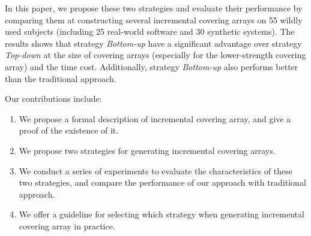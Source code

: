 \documentclass[conference]{IEEEtran}
\theoremstyle{definition}
\begin{document}
In this paper, we propose these two strategies and evaluate their performance by comparing them at constructing several incremental covering arrays on 55 wildly used subjects (including 25 real-world software and 30 synthetic systems). The results shows that strategy \emph{Bottom-up} have a significant advantage over strategy \emph{Top-down} at the size of covering arrays (especially for the lower-strength covering array) and the time cost.  Additionally, strategy \emph{Bottom-up} also performs better than the traditional approach.


%


%
%
%
%
Our contributions include:

 \begin{enumerate}
 \item  We propose a formal description of incremental covering array, and give a proof of the existence of it.
 \item  We propose two strategies for generating incremental covering arrays.
 \item  We conduct a series of experiments to evaluate the characteristics of these two strategies, and compare the performance of our approach with traditional approach.
 \item  We offer a guideline for selecting which strategy when generating incremental covering array in practice.
\end{enumerate}
%
\end{document}
